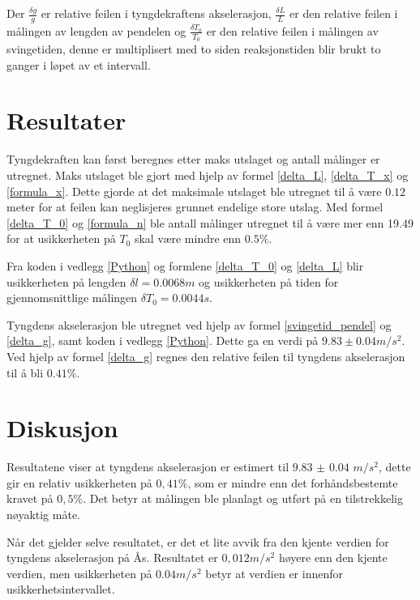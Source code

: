 \documentclass[twocolumn, 11pt]{article} %
\begin{document}
Der \textit{$\frac{\delta g}{g}$} er relative feilen i tyngdekraftens akselerasjon, \textit{$\frac{\delta L}{L}$} er den relative feilen i målingen av lengden av pendelen og \textit{$\frac{\delta T_0}{T_0}$} er den relative feilen i målingen av svingetiden, denne er multiplisert med to siden reaksjonstiden blir brukt to ganger i løpet av et intervall. 


\section{Resultater}

Tyngdekraften kan først beregnes etter maks utslaget og antall målinger er utregnet. Maks utslaget ble gjort med hjelp av formel \eqref{delta_L}, \eqref{delta_T_x} og \eqref{formula_x}. Dette gjorde at det maksimale utslaget ble utregnet til å være $0.12$ meter for at feilen kan neglisjeres grunnet endelige store utslag. 
Med formel \eqref{delta_T_0} og \eqref{formula_n} ble antall målinger utregnet til å være mer enn 19.49 for at usikkerheten på $T_0$ skal være mindre enn $0.5\%$.

Fra koden i vedlegg \ref{Python} og formlene \eqref{delta_T_0} og \eqref{delta_L} blir usikkerheten på lengden $\delta l = 0.0068 m$ og usikkerheten på tiden for gjennomsnittlige målingen $\delta T_0 = 0.0044 s$.

Tyngdens akselerasjon ble utregnet ved hjelp av formel \eqref{svingetid_pendel} og \eqref{delta_g}, samt koden i vedlegg \ref{Python}. Dette ga en verdi på $9.83 \pm 0.04  m/s^2$. Ved hjelp av formel \eqref{delta_g} regnes den relative feilen til tyngdens akselerasjon til å bli $0.41\%$.

\section{Diskusjon}

  
Resultatene viser at tyngdens akselerasjon er estimert til $9.83$ $\pm$ $0.04$ $m/s^2$, dette gir en relativ usikkerheten på $0,41\%$, som er mindre enn det forhåndsbestemte kravet på  $0,5\%$. Det betyr at målingen ble planlagt og utført på en tilstrekkelig nøyaktig måte.

Når det gjelder selve resultatet, er det et lite avvik fra den kjente verdien for tyngdens akselerasjon på Ås. Resultatet er $0,012 m/s^2$ høyere enn den kjente verdien, men usikkerheten på $0.04 m/s^2$ betyr at verdien er innenfor usikkerhetsintervallet. 
\end{document}
